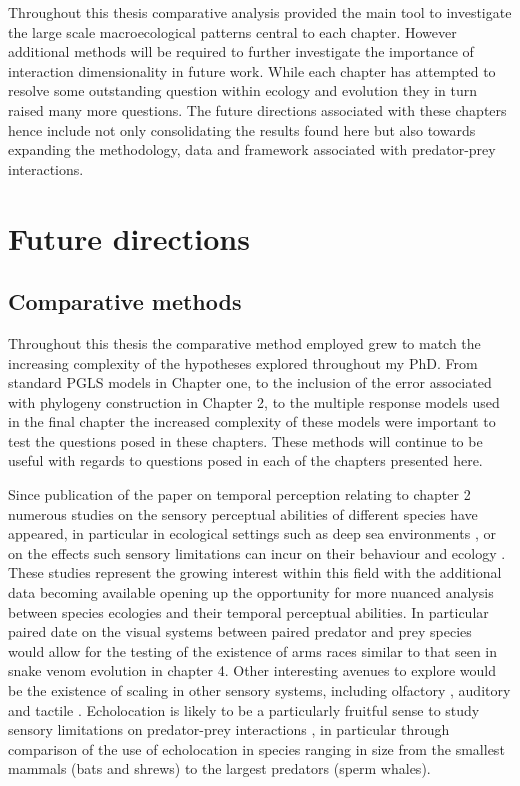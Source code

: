 Throughout this thesis comparative analysis provided the main tool to investigate the large scale macroecological patterns central to each chapter. However additional methods will be required to further investigate the importance of interaction dimensionality in future work. While each chapter has attempted to resolve some outstanding question within ecology and evolution they in turn raised many more questions. The future directions associated with these chapters hence include not only consolidating the results found here but also towards expanding the methodology, data and framework associated with predator-prey interactions.


\section{\uppercase{F}uture directions}

\subsection{Comparative methods}


Throughout this thesis the comparative method employed grew to match the increasing complexity of the hypotheses explored throughout my PhD. From standard PGLS models in Chapter one, to the inclusion of the error associated with phylogeny construction in Chapter 2, to the multiple response models used in the final chapter the increased complexity of these models were important to test the questions posed in these chapters. These methods will continue to be useful with regards to questions posed in each of the chapters presented here. 

Since publication of the paper on temporal perception relating to chapter 2 \citep{healy2013metabolic} numerous studies on the sensory perceptual abilities of different species have appeared, in particular in ecological settings such as deep sea environments \citep{kalinoski2014spectral,Wegner15052015,landgren2014visual}, or on the effects such sensory limitations can incur on their behaviour and ecology \citep{bar2015sensory,inger2014potential}. These studies represent the growing interest within this field with the additional data becoming available opening up the opportunity for more nuanced analysis between species ecologies and their temporal perceptual abilities. In particular paired date on the visual systems between paired predator and prey species would allow for the testing of the existence of arms races similar to that seen in snake venom evolution in chapter 4. Other interesting avenues to explore would be the existence of scaling in other sensory systems, including olfactory \citep{uchida2003speed}, auditory \citep{bar2015sensory} and tactile \citep{braam2005touch}. Echolocation is likely to be a particularly fruitful sense to study sensory limitations on predator-prey interactions \citep{bar2015sensory}, in particular through comparison of the use of echolocation in species ranging in size from the smallest mammals (bats and shrews) to the largest predators (sperm whales).


